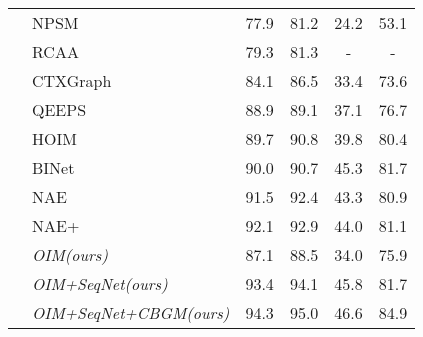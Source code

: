 \documentclass[letterpaper]{article} \usepackage{aaai21}  \usepackage{times}  \usepackage{helvet} \usepackage{courier}  \usepackage[hyphens]{url}  \usepackage{graphicx} \urlstyle{rm} \def\UrlFont{\rm}  \usepackage{natbib}  \usepackage{caption} \usepackage{multirow}
\begin{document}
\begin{table}[t]
{\begin{tabular}{|l|l|cc|cc|}
                                                                   & NPSM\cite{npsm}                         & 77.9                              & 81.2          & 24.2           & 53.1          \\
                                                                   & RCAA\cite{rcaa}                         & 79.3                              & 81.3          & -              & -             \\
                                                                   & CTXGraph\cite{context}                  & 84.1                              & 86.5          & 33.4           & 73.6          \\
                                                                   & QEEPS\cite{qeeps}                       & 88.9                              & 89.1          & 37.1           & 76.7          \\
                                                                   & HOIM\cite{hoim}                         & 89.7                              & 90.8          & 39.8           & 80.4          \\
                                                                   & BINet\cite{binet}                       & 90.0                              & 90.7          & 45.3           & 81.7          \\
                                                                   & NAE\cite{nae}                           & 91.5                              & 92.4          & 43.3           & 80.9          \\
                                                                   & NAE+\cite{nae}                          & 92.1                              & 92.9          & 44.0           & 81.1          \\ \cline{2-6}
                                                                   & \textit{OIM(ours)}                      & 87.1                              & 88.5          & 34.0           & 75.9          \\
                                                                   & \textit{OIM+SeqNet(ours)}               & 93.4                              & 94.1          & 45.8           & 81.7          \\
                                                                   & \textit{OIM+SeqNet+CBGM(ours)}          & 94.3                              & 95.0          & 46.6           & 84.9          \\

\end{tabular}}
\end{table}
\end{document}
